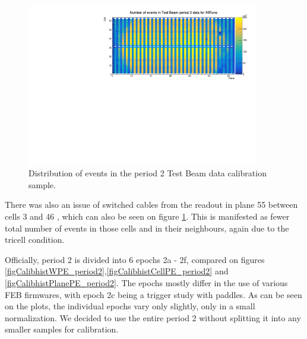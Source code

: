 \documentclass[12pt,a4paper]{article}
\begin{document}
\begin{figure}[h]
\centering
\includegraphics[width=0.9\textwidth]{Plots/Attenprofs_P2Data_CellPlane_AllRuns.pdf}
\caption{Distribution of events in the period 2 Test Beam data calibration sample.}
\label{figCalibhist_period2}
\end{figure}

There was also an issue of switched cables from the readout in plane 55 between cells 3 and 46 \cite{NOVA-doc-49674}, which can also be seen on figure \ref{figCalibhist_period2}. This is manifested as fewer total number of events in those cells and in their neighbours, again due to the tricell condition.

Officially, period 2 is divided into 6 epochs 2a - 2f, compared on figures \ref{figCalibhistWPE_period2},\ref{figCalibhistCellPE_period2} and \ref{figCalibhistPlanePE_period2}. The epochs mostly differ in the use of various FEB firmwares, with epoch 2c being a trigger study with paddles. As can be seen on the plots, the individual epochs vary only slightly, only in a small normalization. We decided to use the entire period 2 without splitting it into any smaller samples for calibration.
\end{document}
